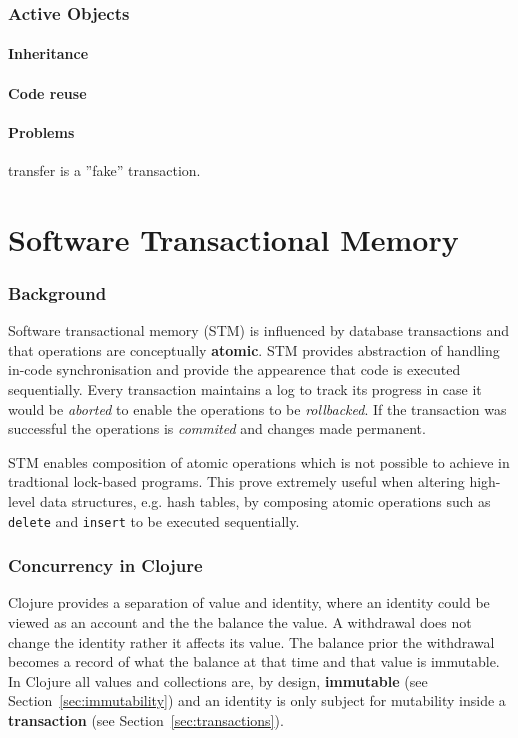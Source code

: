 \documentclass[a4paper,12pt]{kth-mag}
\begin{document}
\section{Active Objects}
\subsection{Inheritance}
\subsection{Code reuse}
\subsection{Problems}
transfer is a ''fake'' transaction.

\part{ Software Transactional Memory}

\section{Background}
Software transactional memory (STM) is influenced by database transactions and that operations are conceptually \textbf{atomic}. STM provides abstraction of handling in-code synchronisation and provide the appearence that code is executed sequentially. Every transaction maintains a log to track its progress in case it would be \textit{aborted} to enable the operations to be \textit{rollbacked}. If the transaction was successful the operations is \textit{commited} and changes made permanent.

STM enables composition of atomic operations\cite{cmt} which is not possible to achieve in tradtional lock-based programs. This prove extremely useful when altering high-level data structures, e.g. hash tables, by composing atomic operations such as \texttt{delete} and \texttt{insert} to be executed sequentially. 

\section{Concurrency in Clojure}
Clojure provides a separation of value and identity, where an identity could be viewed as an account and the the balance the value. A withdrawal does not change the identity rather it affects its value. The balance prior the withdrawal becomes a record of what the balance at that time and that value is immutable. In Clojure all values and collections are, by design, \textbf{immutable} (see Section~\ref{sec:immutability}) and an identity is only subject for mutability inside a \textbf{transaction} (see Section~\ref{sec:transactions}).
\end{document}
